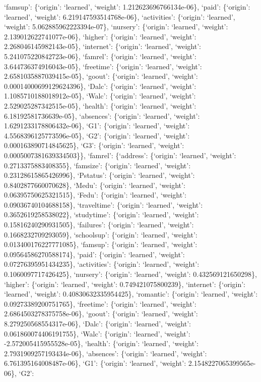 \documentclass[
]{article}
\begin{document}
`famsup': \{`origin': `learned', `weight': 1.212623696766134e-06\},
`paid': \{`origin': `learned', `weight': 6.219147593514768e-06\},
`activities': \{`origin': `learned', `weight': 5.062885962223394e-07\},
`nursery': \{`origin': `learned', `weight': 2.139012622741077e-06\},
`higher': \{`origin': `learned', `weight': 2.268046145982143e-05\},
`internet': \{`origin': `learned', `weight': 5.241075220842723e-06\},
`famrel': \{`origin': `learned', `weight': 3.644736374916043e-05\},
`freetime': \{`origin': `learned', `weight': 2.6581035887039415e-05\},
`goout': \{`origin': `learned', `weight': 0.00014000699129624396\},
`Dalc': \{`origin': `learned', `weight': 1.1085710188018912e-05\},
`Walc': \{`origin': `learned', `weight': 2.529025287342515e-05\},
`health': \{`origin': `learned', `weight': 6.18192581736639e-05\},
`absences': \{`origin': `learned', `weight': 1.6291233178806432e-06\},
`G1': \{`origin': `learned', `weight': 4.5568396125773596e-05\}, `G2':
\{`origin': `learned', `weight': 0.000163890714845625\}, `G3':
\{`origin': `learned', `weight': 0.0005007381639334503\}\}, `famrel':
\{`address': \{`origin': `learned', `weight': 0.2713375883408355\},
`famsize': \{`origin': `learned', `weight': 0.23128615865426996\},
`Pstatus': \{`origin': `learned', `weight': 0.8402877660070628\},
`Medu': \{`origin': `learned', `weight': 0.06395750625321515\}, `Fedu':
\{`origin': `learned', `weight': 0.09036740104688158\}, `traveltime':
\{`origin': `learned', `weight': 0.3652619258538022\}, `studytime':
\{`origin': `learned', `weight': 0.15816240290931505\}, `failures':
\{`origin': `learned', `weight': 0.1668232709293059\}, `schoolsup':
\{`origin': `learned', `weight': 0.013400176227771085\}, `famsup':
\{`origin': `learned', `weight': 0.09564586270588174\}, `paid':
\{`origin': `learned', `weight': 0.07276395951434235\}, `activities':
\{`origin': `learned', `weight': 0.1060097717426425\}, `nursery':
\{`origin': `learned', `weight': 0.432569121650298\}, `higher':
\{`origin': `learned', `weight': 0.749421075800239\}, `internet':
\{`origin': `learned', `weight': 0.40830632335954425\}, `romantic':
\{`origin': `learned', `weight': 0.09273389200751765\}, `freetime':
\{`origin': `learned', `weight': 2.6864503278375758e-06\}, `goout':
\{`origin': `learned', `weight': 8.279250568554317e-06\}, `Dalc':
\{`origin': `learned', `weight': 0.061860074406191755\}, `Walc':
\{`origin': `learned', `weight': -2.572005415955528e-05\}, `health':
\{`origin': `learned', `weight': 2.7931909257193434e-06\}, `absences':
\{`origin': `learned', `weight': 6.761395164008487e-06\}, `G1':
\{`origin': `learned', `weight': 2.1548227065399565e-06\}, `G2':
\end{document}

